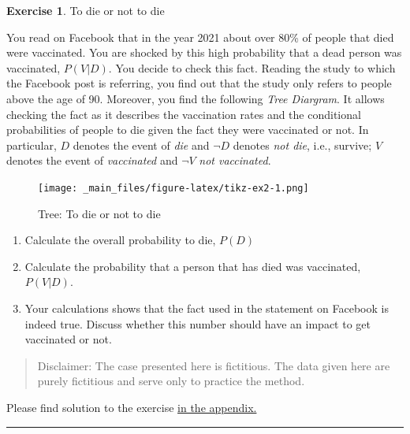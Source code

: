 \documentclass[
  12pt,
  oneside]{book}
\providecommand{\tightlist}{%
  \setlength{\itemsep}{0pt}\setlength{\parskip}{0pt}}
\theoremstyle{definition}
\theoremstyle{definition}
\theoremstyle{definition}
\newtheorem{exercise}{Exercise}[chapter]
\theoremstyle{definition}
\theoremstyle{remark}
\begin{document}
\begin{exercise}
\protect\hypertarget{exr:todieornot}{}\label{exr:todieornot}To die or not to die

You read on Facebook that in the year 2021 about over 80\% of people that died were vaccinated. You are shocked by this high probability that a dead person was vaccinated, \(P(V|D)\). You decide to check this fact. Reading the study to which the Facebook post is referring, you find out that the study only refers to people above the age of 90. Moreover, you find the following \emph{Tree Diargram}. It allows checking the fact as it describes the vaccination rates and the conditional probabilities of people to die given the fact they were vaccinated or not.
In particular, \(D\) denotes the event of \emph{die} and \(\neg D\) denotes \emph{not die}, i.e., survive; \(V\) denotes the event of \emph{vaccinated} and \(\neg V\) \emph{not vaccinated}.
\end{exercise}

\begin{figure}
\centering
\texttt{[image: \_main\_files/figure-latex/tikz-ex2-1.png]}
\caption{\label{fig:tikz-ex2}Tree: To die or not to die}
\end{figure}

\begin{enumerate}
\def\labelenumi{\alph{enumi})}
\tightlist
\item
  Calculate the overall probability to die, \(P(D)\)
\item
  Calculate the probability that a person that has died was vaccinated, \(P(V|D)\).
\item
  Your calculations shows that the fact used in the statement on Facebook is indeed true. Discuss whether this number should have an impact to get vaccinated or not.
\end{enumerate}

\begin{quote}
Disclaimer: The case presented here is fictitious. The data given here are purely fictitious and serve only to practice the method.
\end{quote}

Please find solution to the exercise \protect\hyperlink{sol:todieornot}{in the appendix.}

\begin{center}\rule{0.5\linewidth}{0.5pt}\end{center}

\begin{verbatim}
\end{verbatim}
\end{document}
